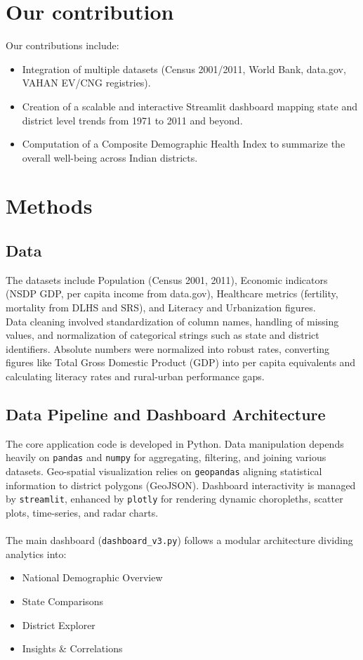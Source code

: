 \documentclass[abstract=true]{scrartcl}
\begin{document}
\section{Our contribution}
Our contributions include:
\begin{itemize}
    \item Integration of multiple datasets (Census 2001/2011, World Bank, data.gov, VAHAN EV/CNG registries).
    \item Creation of a scalable and interactive Streamlit dashboard mapping state and district level trends from 1971 to 2011 and beyond.
    \item Computation of a Composite Demographic Health Index to summarize the overall well-being across Indian districts.
\end{itemize}

\section{Methods}
\subsection{Data}
The datasets include Population (Census 2001, 2011), Economic indicators (NSDP GDP, per capita income from data.gov), Healthcare metrics (fertility, mortality from DLHS and SRS), and Literacy and Urbanization figures. 
\\
Data cleaning involved standardization of column names, handling of missing values, and normalization of categorical strings such as state and district identifiers. Absolute numbers were normalized into robust rates, converting figures like Total Gross Domestic Product (GDP) into per capita equivalents and calculating literacy rates and rural-urban performance gaps.

\subsection{Data Pipeline and Dashboard Architecture}
The core application code is developed in Python. Data manipulation depends heavily on \verb|pandas| and \verb|numpy| for aggregating, filtering, and joining various datasets. Geo-spatial visualization relies on \verb|geopandas| aligning statistical information to district polygons (GeoJSON). Dashboard interactivity is managed by \verb|streamlit|, enhanced by \verb|plotly| for rendering dynamic choropleths, scatter plots, time-series, and radar charts. 
\\\\
The main dashboard (\verb|dashboard_v3.py|) follows a modular architecture dividing analytics into:
\begin{itemize}
    \item National Demographic Overview
    \item State Comparisons
    \item District Explorer
    \item Insights \& Correlations
\end{itemize}
\end{document}
